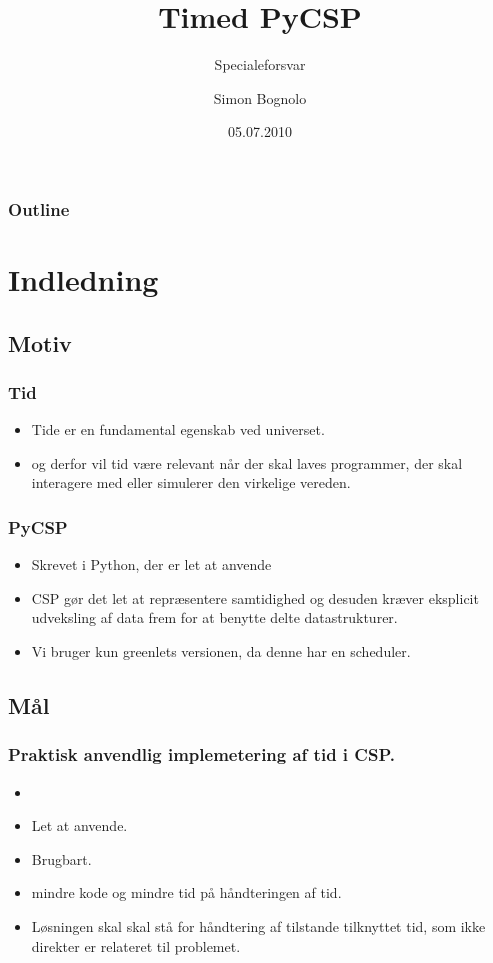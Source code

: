 \documentclass{beamer}
\title
{Timed PyCSP}
\subtitle
{Specialeforsvar}
\author
{Simon Bognolo}
\date
{05.07.2010}
\begin{document}
\begin{frame}
  \titlepage
\end{frame}

\begin{frame}
  \frametitle{Outline}
  \tableofcontents
\end{frame}

\section{Indledning}
\subsection{Motiv}
\begin{frame}
  \frametitle{Tid}
  \begin{itemize}
\item Tide er en fundamental egenskab ved universet.
\item og derfor vil tid være relevant når der skal laves programmer, der skal interagere med  eller simulerer den virkelige vereden.
  \end{itemize}
\end{frame}

\begin{frame}
  \frametitle{PyCSP}
  \begin{itemize}
\item Skrevet i Python, der er let at anvende
\item CSP  gør det let at repræsentere samtidighed og desuden kræver eksplicit udveksling af data frem for at benytte
delte datastrukturer.
\item Vi bruger kun greenlets versionen, da denne har en scheduler.
  \end{itemize}
\end{frame}

\subsection{Mål}
\begin{frame}
  \frametitle{Praktisk anvendlig implemetering af tid i CSP.}
  \begin{itemize}
	\item 
	\item Let at anvende.
	\item Brugbart.
	\item mindre kode og mindre tid på håndteringen af tid. 
	\item Løsningen skal skal stå for håndtering af tilstande tilknyttet tid, som ikke direkter er relateret til problemet.
  \end{itemize}
\end{frame}
\end{document}
